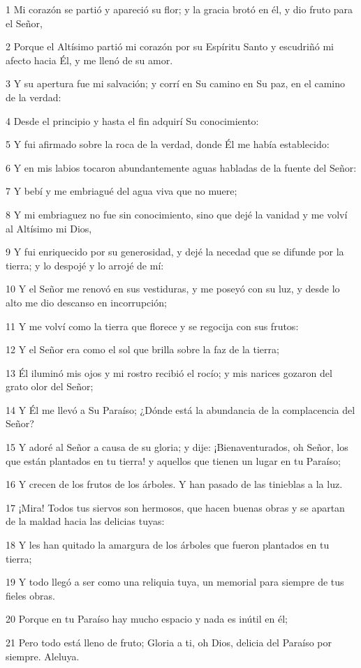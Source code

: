 \par 1 Mi corazón se partió y apareció su flor; y la gracia brotó en él, y dio fruto para el Señor,
\par 2 Porque el Altísimo partió mi corazón por su Espíritu Santo y escudriñó mi afecto hacia Él, y me llenó de su amor.
\par 3 Y su apertura fue mi salvación; y corrí en Su camino en Su paz, en el camino de la verdad:
\par 4 Desde el principio y hasta el fin adquirí Su conocimiento:
\par 5 Y fui afirmado sobre la roca de la verdad, donde Él me había establecido:
\par 6 Y en mis labios tocaron abundantemente aguas habladas de la fuente del Señor:
\par 7 Y bebí y me embriagué del agua viva que no muere;
\par 8 Y mi embriaguez no fue sin conocimiento, sino que dejé la vanidad y me volví al Altísimo mi Dios,
\par 9 Y fui enriquecido por su generosidad, y dejé la necedad que se difunde por la tierra; y lo despojé y lo arrojé de mí:
\par 10 Y el Señor me renovó en sus vestiduras, y me poseyó con su luz, y desde lo alto me dio descanso en incorrupción;
\par 11 Y me volví como la tierra que florece y se regocija con sus frutos:
\par 12 Y el Señor era como el sol que brilla sobre la faz de la tierra;
\par 13 Él iluminó mis ojos y mi rostro recibió el rocío; y mis narices gozaron del grato olor del Señor;
\par 14 Y Él me llevó a Su Paraíso; ¿Dónde está la abundancia de la complacencia del Señor?
\par 15 Y adoré al Señor a causa de su gloria; y dije: ¡Bienaventurados, oh Señor, los que están plantados en tu tierra! y aquellos que tienen un lugar en tu Paraíso;
\par 16 Y crecen de los frutos de los árboles. Y han pasado de las tinieblas a la luz.
\par 17 ¡Mira! Todos tus siervos son hermosos, que hacen buenas obras y se apartan de la maldad hacia las delicias tuyas:
\par 18 Y les han quitado la amargura de los árboles que fueron plantados en tu tierra;
\par 19 Y todo llegó a ser como una reliquia tuya, un memorial para siempre de tus fieles obras.
\par 20 Porque en tu Paraíso hay mucho espacio y nada es inútil en él;
\par 21 Pero todo está lleno de fruto; Gloria a ti, oh Dios, delicia del Paraíso por siempre. Aleluya.


